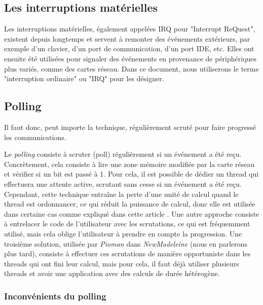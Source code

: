 \subsection{Les interruptions matérielles}

Les interruptions matérielles, également appelées IRQ pour "Interrupt ReQuest", existent depuis longtemps et
servent à remonter des événements extérieurs, par exemple d'un clavier, d'un port de communication, d'un port IDE, etc.
Elles ont ensuite été utilisées pour signaler des événements en provenance de périphériques plus variés, comme des cartes réseau.
Dans ce document, nous utiliserons le terme "interruption ordinaire" ou "IRQ" pour les désigner.

\subsection{Polling}
\label{sec:polling}

Il faut donc, peut importe la technique, régulièrement scruté pour faire progressé les communications.


Le \emph{polling} consiste à scruter (poll) régulièrement si un événement a été reçu.
Concrètement, cela consiste à lire une zone mémoire modifiée par la carte réseau et vérifier si un bit est passé à 1.
Pour cela, il est possible de dédier un thread qui effectuera une attente active, scrutant sans cesse si un événement a été reçu.
Cependant, cette technique entraîne la perte d'une unité de calcul quand le thread est ordonnancer, ce qui réduit la puissance de calcul, donc elle est utilisée dans certaine cas comme expliqué dans cette article \cite{denis:hal-03695835}.
Une autre approche consiste à entrelacer le code de l'utilisateur avec les scrutations, ce qui est fréquemment utilisé, mais cela oblige l'utilisateur à prendre en compte la progression.
Une troisième solution, utilisée par \emph{Pioman} dans \emph{NewMadeleine} (nous en parlerons plus tard), consiste à effectuer ces scrutations de manière opportuniste dans les threads qui ont fini leur calcul, mais pour cela, il faut déjà utiliser plusieurs threads et avoir une application avec des calculs de durée hétérogène.

\subsubsection{Inconvénients du polling}


